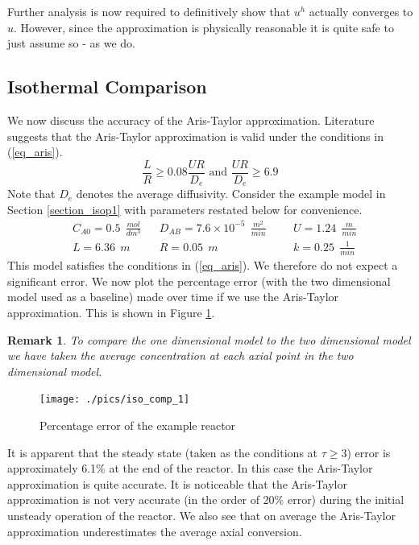 \documentclass[11pt,fleqn]{article}
\theoremstyle{defstyle}
\newtheorem{rmrk}{Remark}[section]
\begin{document}
Further analysis is now required to definitively show that $u^h$ actually converges to $u$. However, since the approximation is physically reasonable it is quite safe to just assume so - as we do.

\subsection{Isothermal Comparison}
We now discuss the accuracy of the Aris-Taylor approximation. Literature \cite{washington} suggests that the Aris-Taylor approximation is valid under the conditions in (\ref{eq_aris}).
\begin{equation}
\frac{L}{R} \geq 0.08\frac{UR}{D_e} \text{ and } \frac{UR}{D_e} \geq 6.9
\label{eq_aris}
\end{equation}
Note that $D_e$ denotes the average diffusivity. Consider the example model in Section \ref{section_isop1} with parameters restated below for convenience.
\begin{equation*}
\begin{aligned}
&C_{A0} = 0.5~~ \frac{mol}{dm^3}
&&D_{AB} = 7.6\times 10^{-5} ~~\frac{m^2}{min}
&&&U = 1.24~~ \frac{m}{min} \\
&L = 6.36~~ m 
&&R = 0.05~~ m
&&&k = 0.25~~ \frac{1}{min} 
\end{aligned}
\end{equation*}
This model satisfies the conditions in (\ref{eq_aris}). We therefore do not expect a significant error. We now plot the percentage error (with the two dimensional model used as a baseline) made over time if we use the Aris-Taylor approximation. This is shown in Figure \ref{fig_isocomp1}.
\begin{rmrk}
To compare the one dimensional model to the two dimensional model we have taken the average concentration at each axial point in the two dimensional model.
\end{rmrk}
\begin{figure}[H] 
\centering
\texttt{[image: ./pics/iso\_comp\_1]}
\caption{Percentage error of the example reactor} 
\label{fig_isocomp1}
\end{figure}
It is apparent that the steady state (taken as the conditions at $\tau \geq 3$) error is approximately 6.1\% at the end of the reactor. In this case the Aris-Taylor approximation is quite accurate. It is noticeable that the Aris-Taylor approximation is not very accurate (in the order of 20\% error) during the initial unsteady operation of the reactor. We also see that on average the Aris-Taylor approximation underestimates the average axial conversion. 
\end{document}
